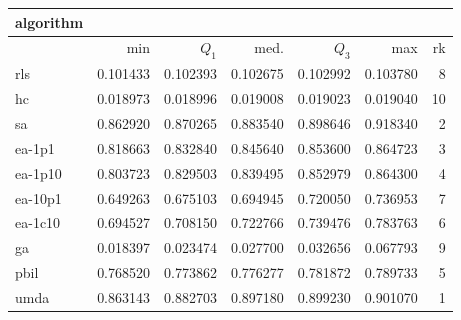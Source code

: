 \begin{tabular}{@{}l*{5}{>{{}}N{1}{3}}>{{}}N{2}{0}@{}}
\toprule
{algorithm} &  \\
\midrule
& {min} & {$Q_1$} & {med.} & {$Q_3$} & {max} & {rk}\\
\midrule
rls & 0.101433 & 0.102393 & 0.102675 & 0.102992 & 0.103780 & 8\\
hc & 0.018973 & 0.018996 & 0.019008 & 0.019023 & 0.019040 & 10\\
sa & 0.862920 & 0.870265 & 0.883540 & 0.898646 & {\color{blue}} 0.918340 & 2\\
ea-1p1 & 0.818663 & 0.832840 & 0.845640 & 0.853600 & 0.864723 & 3\\
ea-1p10 & 0.803723 & 0.829503 & 0.839495 & 0.852979 & 0.864300 & 4\\
ea-10p1 & 0.649263 & 0.675103 & 0.694945 & 0.720050 & 0.736953 & 7\\
ea-1c10 & 0.694527 & 0.708150 & 0.722766 & 0.739476 & 0.783763 & 6\\
ga & 0.018397 & 0.023474 & 0.027700 & 0.032656 & 0.067793 & 9\\
pbil & 0.768520 & 0.773862 & 0.776277 & 0.781872 & 0.789733 & 5\\
umda & {\color{blue}} 0.863143 & {\color{blue}} 0.882703 & {\color{blue}} 0.897180 & {\color{blue}} 0.899230 & 0.901070 & 1\\
\bottomrule
\end{tabular}
